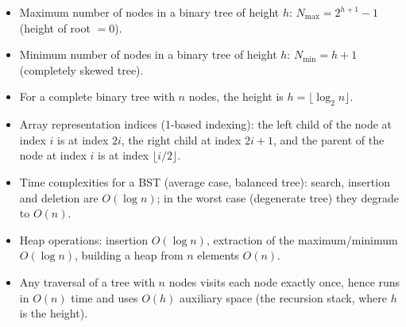 \documentclass[11pt]{article}
\begin{document}
\begin{aretenir}
\begin{itemize}
\item Maximum number of nodes in a binary tree of height $h$: $N_{\max}=2^{h+1}-1$ (height of root $=0$).
\item Minimum number of nodes in a binary tree of height $h$: $N_{\min}=h+1$ (completely skewed tree).
\item For a complete binary tree with $n$ nodes, the height is $h = \lfloor \log_2 n \rfloor$.
\item Array representation indices (1-based indexing): the left child of the node at index $i$ is at index $2i$, the right child at index $2i+1$, and the parent of the node at index $i$ is at index $\lfloor i/2 \rfloor$.
\item Time complexities for a BST (average case, balanced tree): search, insertion and deletion are $O(\log n)$; in the worst case (degenerate tree) they degrade to $O(n)$.
\item Heap operations: insertion $O(\log n)$, extraction of the maximum/minimum $O(\log n)$, building a heap from $n$ elements $O(n)$.
\item Any traversal of a tree with $n$ nodes visits each node exactly once, hence runs in $O(n)$ time and uses $O(h)$ auxiliary space (the recursion stack, where $h$ is the height).
\end{itemize}
\end{aretenir}
\end{document}
